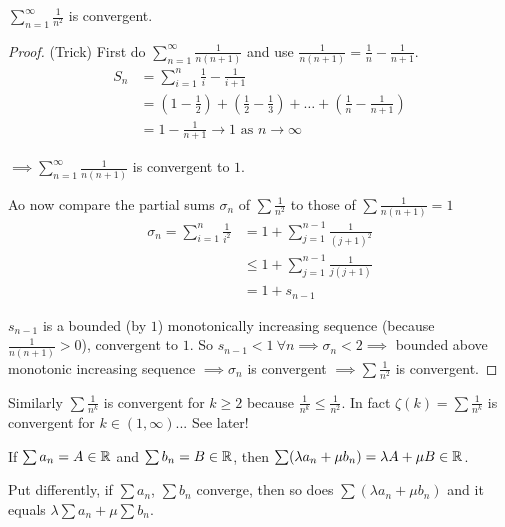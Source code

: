 \documentclass[10pt,twoside]{scrartcl}
\begin{document}
\begin{example}
$\displaystyle{\sum_{n=1}^{\infty} \frac{1}{n^2}}$ is convergent.

\begin{proof}(Trick) First do $\sum_{n=1}^\infty \frac{1}{n(n+1)}$ and use $\frac{1}{n(n+1)} = \frac{1}{n} - \frac{1}{n+1}$.
\begin{align*}
S_n &= \sum_{i=1}^n \frac{1}{i} - \frac{1}{i+1} \\
&= \textstyle{(1-\frac{1}{2}) + (\frac{1}{2} - \frac{1}{3}) + \dots + (\frac{1}{n} - \frac{1}{n+1})}\\
&= 1 - \frac{1}{n+1} \to 1 \text{ as } n \to \infty	
\end{align*}

$\implies \sum_{n=1}^\infty \frac{1}{n(n+1)}$ is convergent to $1$.

Ao now compare the partial sums $\sigma_n$ of $\sum \frac{1}{n^2}$ to those of $\sum \frac{1}{n(n+1)} = 1$
\begin{align*}
\sigma_n = \sum_{i=1}^n \frac{1}{i^2} &= 1 + \sum_{j=1}^{n-1} \frac{1}{(j+1)^2} \\
&\leq 1 + \sum_{j=1}^{n-1}\frac{1}{j(j+1)}\\
&= 1 + s_{n-1}	
\end{align*}

$s_{n-1}$ is a bounded (by $1$) monotonically increasing sequence (because $\frac{1}{n(n+1)} >0$), convergent to $1$. So $s_{n-1} < 1~\forall n \implies \sigma_n < 2 \implies$ bounded above monotonic increasing sequence $\implies \sigma_n$ is convergent $\implies \sum \frac{1}{n^2}$ is convergent.	
\end{proof}
\end{example}


Similarly $\sum \frac{1}{n^k}$ is convergent for $k \geq 2$ because $\frac{1}{n^k} \leq \frac{1}{n^2}$. In fact $\zeta(k) = \sum \frac{1}{n^k}$ is convergent for $k \in (1,\infty)$... See later!\\


\begin{theorem}

If $\sum a_n = A \in\mathbb{R}$ and $\sum b_n = B \in\mathbb{R}$, then $\sum (\lambda a_n + \mu b_n) = \lambda A + \mu B \in\mathbb{R}$. 
\end{theorem}

Put differently, if $\sum a_n$, $\sum b_n$ converge, then so does $\sum (\lambda a_n + \mu b_n)$ and it equals $\lambda \sum a_n + \mu \sum b_n$. 
\end{document}
